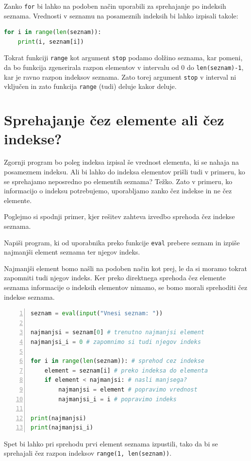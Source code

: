 Zanko \texttt{for} bi lahko na podoben način uporabili za sprehajanje po indeksih seznama. Vrednosti v seznamu na posameznih indeksih bi lahko izpisali takole:
\begin{lstlisting}[language=Python, showstringspaces=false]
for i in range(len(seznam)):
    print(i, seznam[i])
\end{lstlisting}
Tokrat funkciji \texttt{range} kot argument \texttt{stop} podamo dolžino seznama, kar pomeni, da bo funkcija zgenerirala razpon elementov v intervalu od 0 do \texttt{len(seznam)-1}, kar je ravno razpon indeksov seznama. Zato torej argument \texttt{stop} v interval ni vključen in zato funkcija \texttt{range} (tudi) deluje kakor deluje.

\section{Sprehajanje čez elemente ali čez indekse?}
Zgornji program bo poleg indeksa izpisal še vrednost elementa, ki se nahaja na posameznem indeksu. Ali bi lahko do indeksa elementov prišli tudi v primeru, ko se sprehajamo neposredno po elementih seznama? Težko. Zato v primeru, ko informacijo o indeksu potrebujemo, uporabljamo zanko čez indekse in ne čez elemente.  

Poglejmo si spodnji primer, kjer rešitev zahteva izvedbo sprehoda čez indekse seznama.
\begin{zgled}
Napiši program, ki od uporabnika preko funkcije \texttt{eval} prebere seznam in izpiše najmanjši element seznama ter njegov indeks. 
\end{zgled}
\begin{resitev}
Najmanjši element bomo našli na podoben način kot prej, le da si moramo tokrat zapomniti tudi njegov indeks. Ker preko direktnega sprehoda čez elemente seznama informacije o indeksih elementov nimamo, se bomo morali sprehoditi čez indekse seznama.
\begin{lstlisting}[language=Python, showstringspaces=false,numbers=left]
seznam = eval(input("Vnesi seznam: "))

najmanjsi = seznam[0] # trenutno najmanjsi element
najmanjsi_i = 0 # zapomnimo si tudi njegov indeks

for i in range(len(seznam)): # sprehod cez indekse
    element = seznam[i] # preko indeksa do elementa
    if element < najmanjsi: # nasli manjsega?
        najmanjsi = element # popravimo vrednost
        najmanjsi_i = i # popravimo indeks

print(najmanjsi)
print(najmanjsi_i)
\end{lstlisting}
Spet bi lahko pri sprehodu prvi element seznama izpustili, tako da bi se sprehajali čez razpon indeksov \texttt{range(1, len(seznam))}.
\end{resitev}


